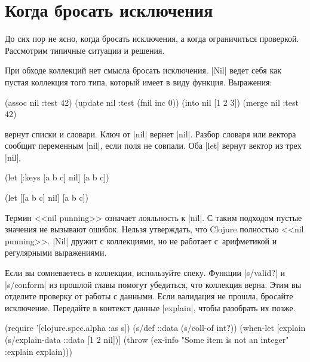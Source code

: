 \section{Когда бросать исключения}

До сих пор не ясно, когда бросать исключения, а когда ограничиться
проверкой. Рассмотрим типичные ситуации и решения.

При обходе коллекций нет смысла бросать исключения. \spverb|Nil| ведет себя как
пустая коллекция того типа, который имеет в виду функция. Выражения:

\begin{english}
  \begin{clojure}
(assoc nil :test 42)
(update nil :test (fnil inc 0))
(into nil [1 2 3])
(merge nil {:test 42})
  \end{clojure}
\end{english}

\noindent
вернут списки и словари. Ключ от \spverb|nil| вернет \spverb|nil|. Разбор
словаря или вектора сообщит переменным \spverb|nil|, если поля не совпали. Оба
\spverb|let| вернут вектор из трех \spverb|nil|.

\begin{english}
  \begin{clojure}
(let [{:keys [a b c]} nil]
  [a b c])

(let [[a b c] nil]
  [a b c])
  \end{clojure}
\end{english}

\noindent


Термин <<nil punning>> означает лояльность к \spverb|nil|. С таким подходом
пустые значения не вызывают ошибок. Нельзя утверждать, что Clojure полностью
<<nil punning>>. \spverb|Nil| дружит с коллекциями, но не работает с~арифметикой
и регулярными выражениями.

Если вы сомневаетесь в коллекции, используйте спеку. Функции \spverb|s/valid?| и
\spverb|s/conform| из прошлой главы  помогут убедиться, что
коллекция верна. Этим вы отделите проверку от работы с данными. Если валидация
не прошла, бросайте исключение. Передайте в контекст данные \spverb|explain|,
чтобы разобрать их позже.

\begin{english}
  \begin{clojure}
(require '[clojure.spec.alpha :as s])
(s/def ::data (s/coll-of int?))
(when-let [explain (s/explain-data ::data [1 2 nil])]
  (throw (ex-info "Some item is not an integer"
                  {:explain explain})))
  \end{clojure}
\end{english}

